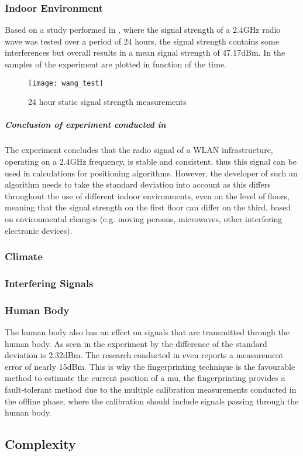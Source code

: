 \subsubsection{Indoor Environment}
Based on a study performed in \cite{Wang2003}, where the signal strength of a 2.4GHz radio wave was tested over a period of 24 hours, the signal strength contains some interferences but overall results in a mean signal strength of 47.17dBm. In \cite{fig:wang_test} the samples of the experiment are plotted in function of the time.
\begin{figure}[h!]
\centering
\texttt{[image: wang\_test]}
\caption{24 hour static signal strength measurements ~\cite{Wang2003}}
\label{fig:wang_test}
\end{figure}
\subparagraph{Conclusion of experiment conducted in ~\cite{Wang2003}}
The experiment concludes that the radio signal of a WLAN infrastructure, operating on a 2.4GHz frequency, is stable and consistent, thus this signal can be used in calculations for positioning algorithms. However, the developer of such an algorithm needs to take the standard deviation into account as this differs throughout the use of different indoor environments, even on the level of floors, meaning that the signal strength on the first floor can differ on the third, based on environmental changes (e.g. moving persons, microwaves, other interfering electronic devices).
\subsubsection{Climate}
\subsubsection{Interfering Signals}
\subsubsection{Human Body}
The human body also has an effect on signals that are transmitted through the human body. As seen in the experiment by \cite{S2016} the difference of the standard deviation is 2.32dBm. The research conducted in \cite{Mautza} even reports a measurement error of nearly 15dBm.
This is why the fingerprinting technique is the favourable method to estimate the current position of a \acrlong{mu}, the fingerprinting provides a fault-tolerant method due to the multiple calibration measurements conducted in the offline phase, where the calibration should include signals passing through the human body.
\subsection{Complexity}
